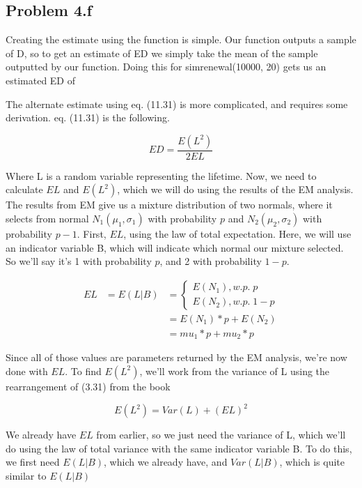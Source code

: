 \documentclass[letter]{article}
\begin{document}
\subsection*{Problem 4.f}

Creating the estimate using the function is simple. Our function outputs a sample of D, so to get an estimate of ED we simply take the mean of the sample outputted by our function. Doing this for simrenewal(10000, 20) gets us an estimated ED of 

The alternate estimate using eq. (11.31) is more complicated, and requires some derivation. eq. (11.31) is the following.

\begin{equation}
	ED = \frac{E(L^2)}{2EL}
\end{equation}

Where L is a random variable representing the lifetime. Now, we need to calculate $EL$ and $E(L^2)$, which we will do using the results of the EM analysis. The results from EM give us a mixture distribution of two normals, where it selects from normal $N_1(\mu_1, \sigma_1)$ with probability $p$ and $N_2(\mu_2, \sigma_2)$ with probability $p-1$. First, $EL$, using the law of total expectation. Here, we will use an indicator variable B, which will indicate which normal our mixture selected. So we'll say it's 1 with probability $p$, and 2 with probability $1-p$.

\begin{equation}
\begin{aligned}
	EL &= E(L | B) &=  	\begin{cases}
					E(N_1),  w.p. \; p \\
					E(N_2),  w.p. \;1-p
				\end{cases}  \\
	&&= E(N_1) * p + E(N_2) \\
	&&= mu_1 * p + mu_2 * p
\end{aligned}
\end{equation}

Since all of those values are parameters returned by the EM analysis, we're now done with $EL$. To find $E(L^2)$, we'll work from the variance of L using the rearrangement of (3.31) from the book

\begin{equation}
	E(L^2) = Var(L) + (EL)^2
\end{equation}

We already have $EL$ from earlier, so we just need the variance of L, which we'll do using the law of total variance with the same indicator variable B. To do this, we first need $E(L|B)$, which we already have, and $Var(L|B)$, which is quite similar to $E(L|B)$
\end{document}
